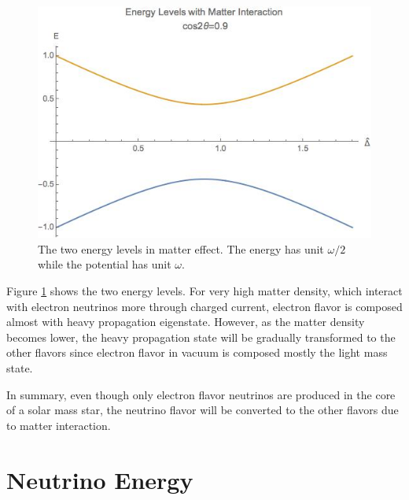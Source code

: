 \documentclass[%
 aip,
 jmp,%
 amsmath,amssymb,
 reprint,%
]{revtex4-1}
\begin{document}
\begin{figure}
\centering
\includegraphics[width=\columnwidth]{assets/mswEnergyLevels.jpg}
\caption{The two energy levels in matter effect. The energy has unit $\omega/2$ while the potential has unit $\omega$.}
\label{fig:mswEnergyLevels}
\end{figure}

Figure \ref{fig:mswEnergyLevels} shows the two energy levels. For very high matter density, which interact with electron neutrinos more through charged current, electron flavor is composed almost with heavy propagation eigenstate. However, as the matter density becomes lower, the heavy propagation state will be gradually transformed to the other flavors since electron flavor in vacuum is composed mostly the light mass state.

In summary, even though only electron flavor neutrinos are produced in the core of a solar mass star, the neutrino flavor will be converted to the other flavors due to matter interaction.









\section{Neutrino Energy}
\end{document}
